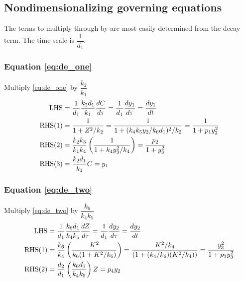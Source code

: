 \documentclass[10pt,letterpaper]{article}
\begin{document}
\subsection{Nondimensionalizing governing equations}

The terms to multiply through by are most easily determined from the decay term. The time scale is $\dfrac{1}{d_1}$.

\subsubsection{Equation \eqref{eq:de_one}}
Multiply \eqref{eq:de_one} by $\dfrac{k_2}{k_1}$
\begin{equation} \label{eq:nondim_de_one}
\begin{gathered}\begin{aligned}
{\rm LHS} &= \frac{1}{d_1} \frac{k_2 d_1}{k_1} \frac{dC}{d\tau} 
           = \frac{1}{d_1} \frac{dy_1}{d\tau}
           = \frac{dy_1}{dt} \\
{\rm RHS(1)} &= \frac{1}{1 + Z^2/k_2} 
              = \frac{1}{1 + (k_4 k_5 y_2 / k_6 d_1)^2/k_2} 
              = \frac{1}{1 + p_1 y_2^2} \\
{\rm RHS(2)} &= \frac{k_2 k_3}{k_1 k_4} \left( \frac{1}{1 + k_4 y_3^2/k_4} \right)
              = \frac{p_2}{1 + y_3^2}  \\
{\rm RHS(3)} &= \frac{k_2 d_1}{k_1} C = y_1
\end{aligned}\end{gathered}
\end{equation}

\subsubsection{Equation \eqref{eq:de_two}}
Multiply \eqref{eq:de_two} by $\dfrac{k_6}{k_4 k_5}$
\begin{equation}\label{eq:nondim_de_two}
\begin{gathered}\begin{aligned}
{\rm LHS} &= \frac{1}{d_1} \frac{k_6 d_1}{k_4 k_5} \frac{dZ}{d\tau} 
           = \frac{1}{d_1} \frac{dy_2}{d\tau} 
           = \frac{dy_2}{dt} \\
{\rm RHS(1)} &= \frac{k_6}{k_4} \left( \frac{K^2}{k_6(1 + K^2/k_6)} \right)
              = \frac{K^2/k_4}{(1 + (k_4/k_6)(K^2/k_4))}
              = \frac{y_3^2}{1 + p_3 y_3^2} \\
{\rm RHS(2)} &= \frac{d_2}{d_1}\left(\frac{k_6 d_1}{k_4 k_5}\right) Z 
              = p_4 y_2
\end{aligned}\end{gathered}
\end{equation}
\end{document}
